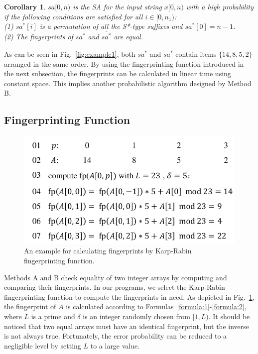 \documentclass[10pt,journal,compsoc]{IEEEtran}
\newtheorem{corollary}[theorem]{Corollary}
\begin{document}
{\begin{corollary} \label{corollary:2}
	$sa[0, n)$ is the SA for the input string $x[0, n)$ with a high probability if the following conditions are satisfied for all $i \in [0, n_1)$: \\
	(1) $sa^*[i]$ is a permutation of all the S*-type suffixes and  $sa^*[0]=n-1$. \\
	(2) The fingerprints of $sa^*$ and $\overline{sa^*}$ are equal. \\
\end{corollary}

As can be seen in Fig.~\ref{fig:example1}, both $sa^*$ and $\overline{sa^*}$ contain items $\{14, 8, 5, 2\}$ arranged in the same order. By using the fingerprinting function introduced in the next subsection, the fingerprints can be calculated in linear time using constant space. This implies another probabilistic algorithm designed by Method B.

\subsection{Fingerprinting Function}

\begin{figure}[htbp!]
	\centering
	
	\includegraphics[width = 0.9\columnwidth]{example2.pdf}
	
	\caption{An example for calculating fingerprints by Karp-Rabin fingerprinting function.}
	
	\label{fig:example2}
	
\end{figure}

Methods A and B check equality of two integer arrays by computing and comparing their fingerprints. In our programs, we select the Karp-Rabin fingerprinting function to compute the fingerprints in need. As depicted in Fig.~\ref{fig:example2}, the fingerprint of $A$ is calculated according to Formulas~\ref{formula:1}-\ref{formula:2}, where $L$ is a prime and $\delta$ is an integer randomly chosen from $[1, L)$. It should be noticed that two equal arrays must have an identical fingerprint, but the inverse is not always true. Fortunately, the error probability can be reduced to a negligible level by setting $L$ to a large value.

}
\end{document}
